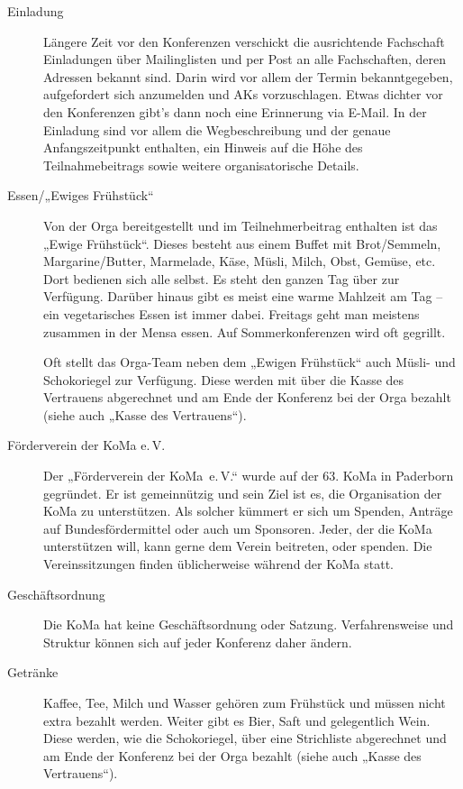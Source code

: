 \begin{description}
\item[Einladung]
    Längere Zeit vor den Konferenzen verschickt die ausrichtende Fachschaft Einladungen über Mailinglisten und per Post an alle Fachschaften, deren Adressen bekannt sind. Darin wird vor allem der Termin bekanntgegeben, aufgefordert sich anzumelden und AKs vorzuschlagen. Etwas dichter vor den Konferenzen gibt’s dann noch eine Erinnerung via E-Mail. In der Einladung sind vor allem die Wegbeschreibung und der genaue Anfangszeitpunkt enthalten, ein Hinweis auf die Höhe des Teilnahmebeitrags sowie weitere organisatorische Details.

\item[Essen/„Ewiges Frühstück“]
    Von der Orga bereitgestellt und im Teilnehmerbeitrag enthalten ist das „Ewige Frühstück“. Dieses besteht aus einem Buffet mit Brot/Semmeln, Margarine/Butter, Marmelade, Käse, Müsli, Milch, Obst, Gemüse, etc. Dort bedienen sich alle selbst. Es steht den ganzen Tag über zur Verfügung. Darüber hinaus gibt es meist eine warme Mahlzeit am Tag -- ein vegetarisches Essen ist immer dabei. Freitags geht man meistens zusammen in der Mensa essen. Auf Sommerkonferenzen wird oft gegrillt.

	Oft stellt das Orga-Team neben dem „Ewigen Frühstück“ auch Müsli- und Schokoriegel zur Verfügung. Diese werden mit über die Kasse des Vertrauens abgerechnet und am Ende der Konferenz bei der Orga bezahlt (siehe auch „Kasse des Vertrauens“).

\item[Förderverein der KoMa e.\,V.]
    Der „Förderverein der KoMa~e.\,V.“ wurde auf der 63. KoMa in Paderborn gegründet. Er ist gemeinnützig und sein Ziel ist es, die Organisation der KoMa zu unterstützen. Als solcher kümmert er sich um Spenden, Anträge auf Bundesfördermittel oder auch um Sponsoren. Jeder, der die KoMa unterstützen will, kann gerne dem Verein beitreten, oder spenden. Die Vereinssitzungen finden üblicherweise während der KoMa statt.

\item[Geschäftsordnung]
    Die KoMa hat keine Geschäftsordnung oder Satzung. Verfahrensweise und Struktur können sich auf jeder Konferenz daher ändern.

\item[Getränke]
    Kaffee, Tee, Milch und Wasser gehören zum Frühstück und müssen nicht extra bezahlt werden. Weiter gibt es Bier, Saft und gelegentlich Wein. Diese werden, wie die Schokoriegel, über eine Strichliste abgerechnet und am Ende der Konferenz bei der Orga bezahlt (siehe auch „Kasse des Vertrauens“).


\end{description}
